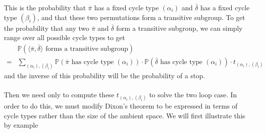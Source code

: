 This is the probability that $\overline\pi$ has a fixed cycle type $(\alpha_i)$ and $\overline\delta$ has a fixed cycle type $(\beta_i)$, and that these two permutations form a transitive subgroup. To get the probability that any two $\overline\pi$ and $\overline\delta$ form a transitive subgroup, we can simply range over all possible cycle types to get
\begin{align*}
	 & \mathbb{P}(\langle \overline\pi,\overline\delta \rangle\text{ forms a transitive subgroup})
	\\= &\sum_{(\alpha_i), (\beta_i)}\mathbb{P}(\overline\pi\text{ has cycle type }(\alpha_i))\cdot\mathbb{P}(\overline\delta\text{ has cycle type }(\alpha_i))\cdot t_{(\alpha_i), (\beta_i)}
\end{align*}
and the inverse of this probability will be the probability of a stop.
\\\\Then we need only to compute these $t_{(\alpha_i), (\beta_i)}$ to solve the two loop case. In order to do this, we must modify Dixon's theorem to be expressed in terms of cycle types rather than the size of the ambient space. We will first illustrate this by example
